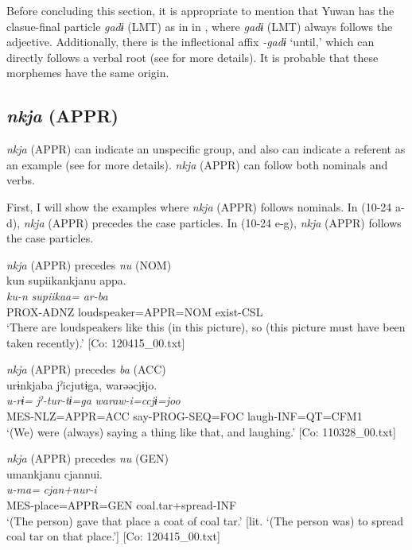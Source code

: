   Before concluding this section, it is appropriate to mention that Yuwan has the clasue-final particle \textit{gadɨ} (LMT) as in  in , where \textit{gadɨ} (LMT) always follows the adjective. Additionally, there is the inflectional affix \textit{{}-gadɨ} ‘until,’ which can directly follows a verbal root (see  for more details). It is probable that these morphemes have the same origin.

\subsection{\textit{nkja} (APPR)}\label{sec:10.1.6}

\textit{nkja} (APPR) can indicate an unspecific group, and also can indicate a referent as an example (see  for more details). \textit{nkja} (APPR) can follow both nominals and verbs.

  First, I will show the examples where \textit{nkja} (APPR) follows nominals. In (10-24 a-d), \textit{nkja} (APPR) precedes the case particles. In (10-24 e-g), \textit{nkja} (APPR) follows the case particles.

\ea\label{ex:10.24} 
  \ea \textit{nkja} (APPR) precedes \textit{nu} (NOM)\\
      \glll    kun  {\textbar}supiika{\textbar}nkjanu  appa.\\
      \textit{ku-n}  \textit{supiikaa=}  \textit{ar-ba}\\
      PROX-ADNZ  loudspeaker=APPR=NOM  exist-CSL\\
      \glt       ‘There are loudspeakers like this (in this picture), so (this picture must have been taken recently).’ [Co: 120415\_00.txt]

  \ex  \textit{nkja} (APPR) precedes \textit{ba} (ACC)\\
      \glll    urɨnkjaba  jˀicjutɨga,  warəəcjɨjo.\\
      \textit{u-rɨ=}  \textit{jˀ-tur-tɨ=ga}  \textit{waraw-i=ccjɨ=joo}\\
      MES-NLZ=APPR=ACC  say-PROG-SEQ=FOC  laugh-INF=QT=CFM1\\
      \glt       ‘(We) were (always) saying a thing like that, and laughing.’ [Co: 110328\_00.txt]

  \ex  \textit{nkja} (APPR) precedes \textit{nu} (GEN)\\

      \glll    umankjanu  cjannui.\\
      \textit{u-ma=}  \textit{cjan+nur-i}\\
      MES-place=APPR=GEN  coal.tar+spread-INF\\
    \glt   ‘(The person) gave that place a coat of coal tar.’ [lit. ‘(The person was) to spread coal tar on that place.’]      [Co: 120415\_00.txt]

